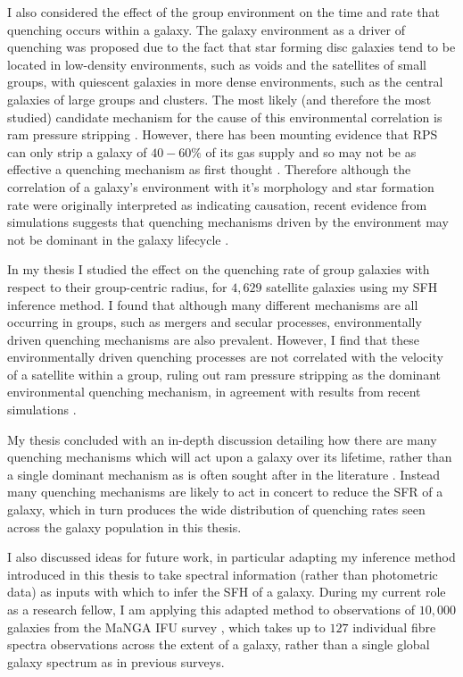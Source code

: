 \documentclass[12pt, usenatbib]{article}
\begin{document}
I also considered the effect of the group environment on the time and rate that quenching occurs within a galaxy. The galaxy environment as a driver of quenching was proposed due to the fact that star forming disc galaxies tend to be located in low-density environments, such as voids and the satellites of small groups, with quiescent galaxies in more dense environments, such as the central galaxies of large groups and clusters. The most likely (and therefore the most studied) candidate mechanism for the cause of this environmental correlation is ram pressure stripping \citep{abadi99, poggianti99}. However, there has been mounting evidence that RPS can only strip a galaxy of $40-60\%$ of its gas supply \citep{fillingham16} and so may not be as effective a quenching mechanism as first thought \citep{emerick16}. Therefore although the correlation of a galaxy's environment with it's morphology and star formation rate were originally interpreted as indicating causation, recent evidence from simulations suggests that quenching mechanisms driven by the environment may not be dominant in the galaxy lifecycle \citep{kimm11, hirschmann14, wang14, phillips15}.

In my thesis I studied the effect on the quenching rate of group galaxies with respect to their group-centric radius, for $4,629$ satellite galaxies using my SFH inference method. I found that although many different mechanisms are all occurring in groups, such as mergers and secular processes, environmentally driven quenching mechanisms are also prevalent. However, I find that these environmentally driven quenching processes are not correlated with the velocity of a satellite within a group, ruling out ram pressure stripping as the dominant environmental quenching mechanism, in agreement with results from recent simulations \citep{fillingham16, emerick16}. 

My thesis concluded with an in-depth discussion detailing how there are many quenching mechanisms which will act upon a galaxy over its lifetime, rather than a single dominant mechanism as is often sought after in the literature \citep[e.g.][]{muzzin12, schawinski14, foltz15, woo15, balogh16, darvish16, huertascompany16}. Instead many quenching mechanisms are likely to act in concert to reduce the SFR of a galaxy, which in turn produces the wide distribution of quenching rates seen across the galaxy population in this thesis. 

I also discussed ideas for future work, in particular adapting my inference method introduced in this thesis to take spectral information (rather than photometric data) as inputs with which to infer the SFH of a galaxy. During my current role as a research fellow, I am applying this adapted method to observations of $10,000$ galaxies from the MaNGA IFU survey \citep{bundy15}, which takes up to $127$ individual fibre spectra observations across the extent of a galaxy, rather than a single global galaxy spectrum as in previous surveys. 
\end{document}
